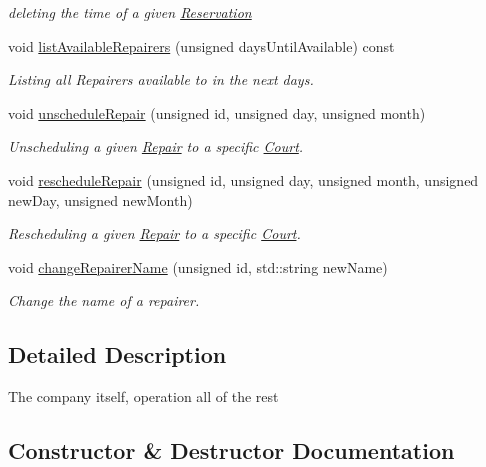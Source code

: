 \begin{DoxyCompactItemize}
$$\begin{DoxyCompactList}\small\item\em deleting the time of a given \mbox{\hyperlink{class_reservation}{Reservation}} \end{DoxyCompactList}\item 
void \mbox{\hyperlink{class_company_a12366416c26ae1d5046695261374f440}{list\+Available\+Repairers}} (unsigned days\+Until\+Available) const
\begin{DoxyCompactList}\small\item\em Listing all Repairers available to in the next days. \end{DoxyCompactList}\item 
void \mbox{\hyperlink{class_company_a64817eefb5be8a9d23af9e0f651b7f71}{unschedule\+Repair}} (unsigned id, unsigned day, unsigned month)
\begin{DoxyCompactList}\small\item\em Unscheduling a given \mbox{\hyperlink{class_repair}{Repair}} to a specific \mbox{\hyperlink{class_court}{Court}}. \end{DoxyCompactList}\item 
void \mbox{\hyperlink{class_company_aaab5975d45b94e576be7fe6b8d0e73e5}{reschedule\+Repair}} (unsigned id, unsigned day, unsigned month, unsigned new\+Day, unsigned new\+Month)
\begin{DoxyCompactList}\small\item\em Rescheduling a given \mbox{\hyperlink{class_repair}{Repair}} to a specific \mbox{\hyperlink{class_court}{Court}}. \end{DoxyCompactList}\item 
void \mbox{\hyperlink{class_company_af3c6fb096e7983f540bdb993852fa47b}{change\+Repairer\+Name}} (unsigned id, std\+::string new\+Name)
\begin{DoxyCompactList}\small\item\em Change the name of a repairer. \end{DoxyCompactList}\end{DoxyCompactItemize}


\subsection{Detailed Description}
The company itself, operation all of the rest 

\subsection{Constructor \& Destructor Documentation}
\mbox{\label{class_company_ac038a4c5e02f13a7bab9b5139990316e}} 
